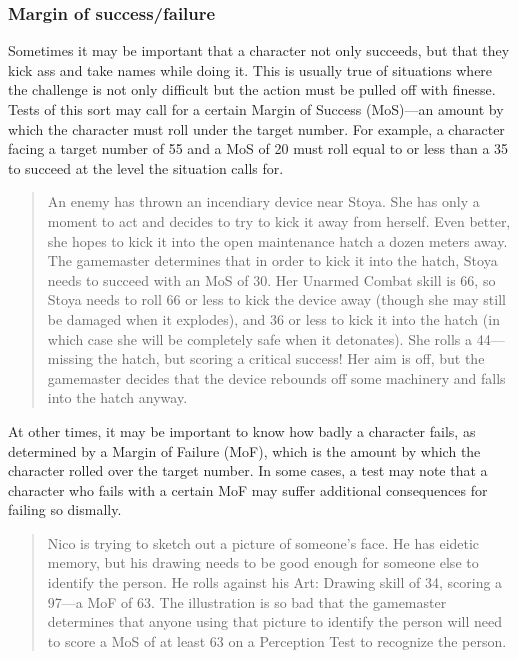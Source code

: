 \subsubsection{Margin of success/failure}
\label{sec:marg-succ}

Sometimes it may be important that a character not only succeeds, but that they kick ass and take names while doing it. This is usually true of situations where the challenge is not only difficult but the action must be pulled off with finesse. Tests of this sort may call for a certain Margin of Success (MoS)—an amount by which the character must roll under the target number. For example, a character facing a target number of 55 and a MoS of 20 must roll equal to or less than a 35 to succeed at the level the situation calls for.

\begin{quotation}
An enemy has thrown an incendiary device near Stoya. She has only a moment to act and decides to try to kick it away from herself. Even better, she hopes to kick it into the open maintenance hatch a dozen meters away. The gamemaster determines that in order to kick it into the hatch, Stoya needs to succeed with an MoS of 30. Her Unarmed Combat skill is 66, so Stoya needs to roll 66 or less to kick the device away (though she may still be damaged when it explodes), and 36 or less to kick it into the hatch (in which case she will be completely safe when it detonates). She rolls a 44—missing the hatch, but scoring a critical success! Her aim is off, but the gamemaster decides that the device rebounds off some machinery and falls into the hatch anyway.
\end{quotation}

At other times, it may be important to know how badly a character fails, as determined by a Margin of Failure (MoF), which is the amount by which the character rolled over the target number. In some cases, a test may note that a character who fails with a certain MoF may suffer additional consequences for failing so dismally.

\begin{quotation}
Nico is trying to sketch out a picture of someone's face. He has eidetic memory, but his drawing needs to be good enough for someone else to identify the person. He rolls against his Art: Drawing skill of 34, scoring a 97—a MoF of 63. The illustration is so bad that the gamemaster determines that anyone using that picture to identify the person will need to score a MoS of at least 63 on a Perception Test to recognize the person.
\end{quotation}

